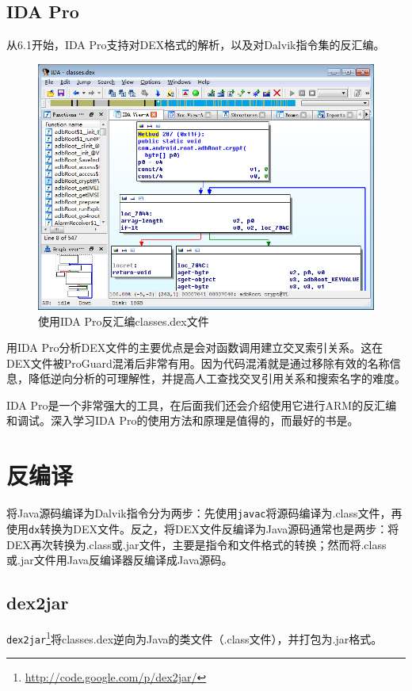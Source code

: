 \subsection{IDA Pro}
从6.1开始，IDA Pro支持对DEX格式的解析，以及对Dalvik指令集的反汇编。

\begin{figure}[htbp]
  \centering
  \includegraphics[width=14cm]{image/ida-dex.png}
  \caption{使用IDA Pro反汇编classes.dex文件}
  \label{Fig:ida-dex}
\end{figure}

用IDA Pro分析DEX文件的主要优点是会对函数调用建立交叉索引关系。这在DEX文件被ProGuard混淆后非常有用。因为代码混淆就是通过移除有效的名称信息，降低逆向分析的可理解性，并提高人工查找交叉引用关系和搜索名字的难度。

IDA Pro是一个非常强大的工具，在后面我们还会介绍使用它进行ARM的反汇编和调试。深入学习IDA Pro的使用方法和原理是值得的，而最好的书是\cite{ida_pro}。

\section{反编译}
将Java源码编译为Dalvik指令分为两步：先使用\lstinline!javac!将源码编译为.class文件，再使用\lstinline!dx!转换为DEX文件。反之，将DEX文件反编译为Java源码通常也是两步：将DEX再次转换为.class或.jar文件，主要是指令和文件格式的转换；然而将.class或.jar文件用Java反编译器反编译成Java源码。

\subsection{dex2jar}
\lstinline!dex2jar!\footnote{\url{http://code.google.com/p/dex2jar/}}将classes.dex逆向为Java的类文件（.class文件），并打包为.jar格式。

